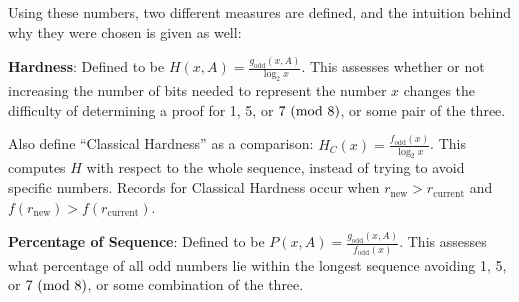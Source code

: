 Using these numbers, two different measures are defined, and the intuition behind why they were chosen is given as well: \par
\textbf{Hardness}: Defined to be $H(x,A) = \frac{g_\text{odd}(x,A)}{\log_2{x}}$. This assesses whether or not increasing the number of bits needed to represent the number $x$ changes the difficulty of determining a proof for 1, 5, or $7\ (\mathrm{mod}\ 8)$, or some pair of the three.  \par
Also define ``Classical Hardness'' as a comparison: $H_C(x) = \frac{f_\text{odd}(x)}{\log_2{x}}$. This computes $H$ with respect to the whole sequence, instead of trying to avoid specific numbers. Records for Classical Hardness occur when $r_\text{new} > r_\text{current}$ and $f(r_\text{new}) > f(r_\text{current})$. \par
\textbf{Percentage of Sequence}: Defined to be $P(x,A) = \frac{g_\text{odd}(x,A)}{f_\text{odd}(x)}$. This assesses what percentage of all odd numbers lie within the longest sequence avoiding 1, 5, or $7\ (\mathrm{mod}\ 8)$, or some combination of the three.

